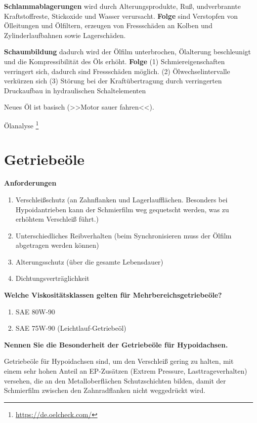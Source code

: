 \textbf{Schlammablagerungen} wird durch Alterungsprodukte, Ruß,
undverbrannte Kraftstoffreste, Stickoxide und Wasser verursacht.
\textbf{Folge} sind Verstopfen von Ölleitungen und Ölfiltern, erzeugen
von Fressschäden an Kolben und Zylinderlaufbahnen sowie Lagerschäden.

\textbf{Schaumbildung} dadurch wird der Ölfilm unterbrochen, Ölalterung
beschleunigt und die Kompressibilität des Öls erhöht. \textbf{Folge} (1)
Schmiereigenschaften verringert sich, dadurch sind Fressschäden möglich.
(2) Ölwechselintervalle verkürzen sich (3) Störung bei der
Kraftübertragung durch verringerten Druckaufbau in hydraulischen
Schaltelementen

Neues Öl ist basisch (>>Motor sauer fahren<<).

Ölanalyse \footnote{\url{https://de.oelcheck.com/}}

\section{Getriebeöle}\label{getriebeoele}

\textbf{Anforderungen}

\begin{enumerate}
\item
  Verschleißschutz (an Zahnflanken und Lagerlaufflächen. Besonders bei
  Hypoidantrieben kann der Schmierfilm weg gequetscht werden, was zu
  erhöhtem Verschleiß führt.)
\item
  Unterschiedliches Reibverhalten (beim Synchronisieren muss der Ölfilm
  abgetragen werden können)
\item
  Alterungsschutz (über die gesamte Lebensdauer)
\item
  Dichtungsverträglichkeit
\end{enumerate}

\textbf{Welche Viskositätsklassen gelten für Mehrbereichsgetriebeöle?}

\begin{enumerate}
\item
  SAE 80W-90
\item
  SAE 75W-90 (Leichtlauf-Getriebeöl)
\end{enumerate}

\textbf{Nennen Sie die Besonderheit der Getriebeöle für Hypoidachsen.}

Getriebeöle für Hypoidachsen sind, um den Verschleiß gering zu halten,
mit einem sehr hohen Anteil an EP-Zusätzen (Extrem Pressure,
Lasttrageverhalten) versehen, die an den Metalloberflächen
Schutzschichten bilden, damit der Schmierfilm zwischen den
Zahnradflanken nicht weggedrückt wird.

